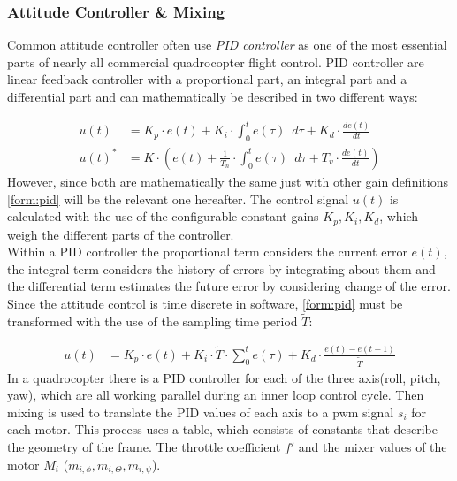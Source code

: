 \newpage

\subsubsection{Attitude Controller \& Mixing} \label{sec:pid}
Common attitude controller often use \emph{PID controller}  as one of the most essential parts of nearly all commercial quadrocopter flight control. 
PID controller are linear feedback controller with a proportional part, an integral part and a differential part and can mathematically be described in two different ways:

\begin{align}
	u(t) &= K_p \cdot e(t) + K_i \cdot \int_{0}^{t} e(\tau) \enspace d\tau + K_d \cdot \frac{de(t)}{dt} \label{form:pid}\\
	u(t)^* &= K \cdot ( e(t) + \frac{1}{T_n} \cdot \int_{0}^{t} e(\tau) \enspace d\tau + T_v \cdot \frac{de(t)}{dt})
\end{align}
\newline
However, since both are mathematically the same just with other gain definitions \cref{form:pid} will be the relevant one hereafter. 
The control signal $u(t)$ is calculated with the use of the configurable constant gains $K_p, K_i, K_d$, which weigh the different parts of the controller.\\
Within a PID controller the proportional term considers the current error $e(t)$, 
the integral term considers the history of errors by integrating about them and 
the differential term estimates the future error by considering change of the error. 
Since the attitude control is time discrete in software, \cref{form:pid} must be transformed with the use of the sampling time period $\tilde{T}$:

\begin{align}
	u(t) &= K_p \cdot e(t) + K_i \cdot \tilde{T} \cdot \sum_{0}^{t}e(\tau) + K_d \cdot \frac{e(t) - e(t-1)}{\tilde{T}} \label{form:pid2}
\end{align}
\newline
In a quadrocopter there is a PID controller for each of the three axis(roll, pitch, yaw), 
which are all working parallel during an inner loop control cycle. 
Then mixing is used to translate the PID values of each axis to a pwm signal $s_i$ for each motor. 
This process uses a table, which consists of constants that describe the geometry of the frame. 
The throttle coefficient $f'$ and the mixer values of the motor $M_i$ ($m_{i,\phi}, m_{i,\Theta}, m_{i,\psi}$).


